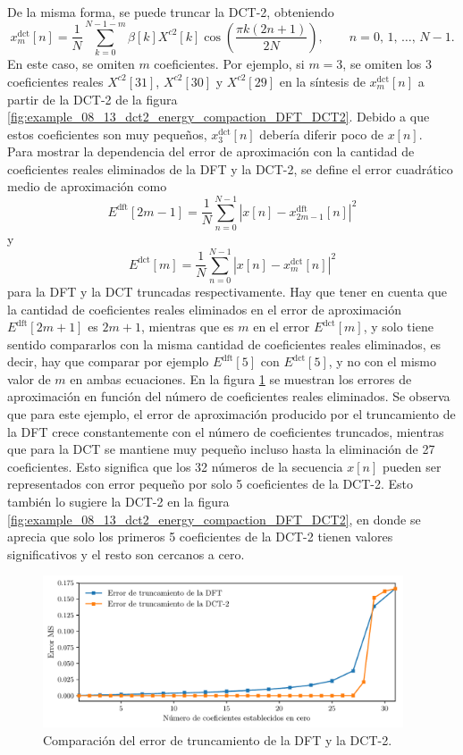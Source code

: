\documentclass[a4paper]{report}
\begin{document}
\\
De la misma forma, se puede truncar la DCT-2, obteniendo
\[
 x_m^\textrm{dct}[n]=\frac{1}{N}\sum_{k=0}^{N-1-m}\beta[k]X^{c2}[k]\cos\left(\frac{\pi k(2n+1)}{2N}\right),
 \qquad 
 n=0,\,1,\,\dots,\,N-1.
\]
En este caso, se omiten \(m\) coeficientes. Por ejemplo, si \(m=3\), se omiten los 3 coeficientes reales \(X^{c2}[31]\), \(X^{c2}[30]\) y \(X^{c2}[29]\) en la síntesis de \(x_m^\textrm{dct}[n]\) a partir de la DCT-2 de la figura \ref{fig:example_08_13_dct2_energy_compaction_DFT_DCT2}. Debido a que estos coeficientes son muy pequeños, \(x_3^\textrm{dct}[n]\) debería diferir poco de \(x[n]\).
\\
Para mostrar la dependencia del error de aproximación con la cantidad de coeficientes reales eliminados de la DFT y la DCT-2, se define el error cuadrático medio de aproximación como
\[
 E^\textrm{dft}[2m-1]=\frac{1}{N}\sum_{n=0}^{N-1}|x[n]-x_{2m-1}^\textrm{dft}[n]|^2
\]
y
\[
 E^\textrm{dct}[m]=\frac{1}{N}\sum_{n=0}^{N-1}|x[n]-x_{m}^\textrm{dct}[n]|^2
\]
para la DFT y la DCT truncadas respectivamente. Hay que tener en cuenta que la cantidad de coeficientes reales eliminados en el error de aproximación \(E^\textrm{dft}[2m+1]\) es \(2m+1\), mientras que es \(m\) en el error \(E^\textrm{dct}[m]\), y solo tiene sentido compararlos con la misma cantidad de coeficientes reales eliminados, es decir, hay que comparar por ejemplo \(E^\textrm{dft}[5]\) con \(E^\textrm{dct}[5]\), y no con el mismo valor de \(m\) en ambas ecuaciones. En la figura \ref{fig:example_08_13_dct2_energy_compaction_MSE} se muestran los errores de aproximación en función del número de coeficientes reales eliminados. Se observa que para este ejemplo, el error de aproximación producido por el truncamiento de la DFT crece constantemente con el número de coeficientes truncados, mientras que para la DCT se mantiene muy pequeño incluso hasta la eliminación de 27 coeficientes. Esto significa que los 32 números de la secuencia \(x[n]\) pueden ser representados con error pequeño por solo 5 coeficientes de la DCT-2. Esto también lo sugiere la DCT-2 en la figura \ref{fig:example_08_13_dct2_energy_compaction_DFT_DCT2}, en donde se aprecia que solo los primeros 5 coeficientes de la DCT-2 tienen valores significativos y el resto son cercanos a cero. 
\begin{figure}[!htb]
 \begin{center}
 \includegraphics[width=0.95\textwidth]{figuras/example_08_13_dct2_energy_compaction_MSE.pdf}
 \caption{\label{fig:example_08_13_dct2_energy_compaction_MSE} Comparación del error de truncamiento de la DFT y la DCT-2.}
 \end{center}
\end{figure}
\end{document}
